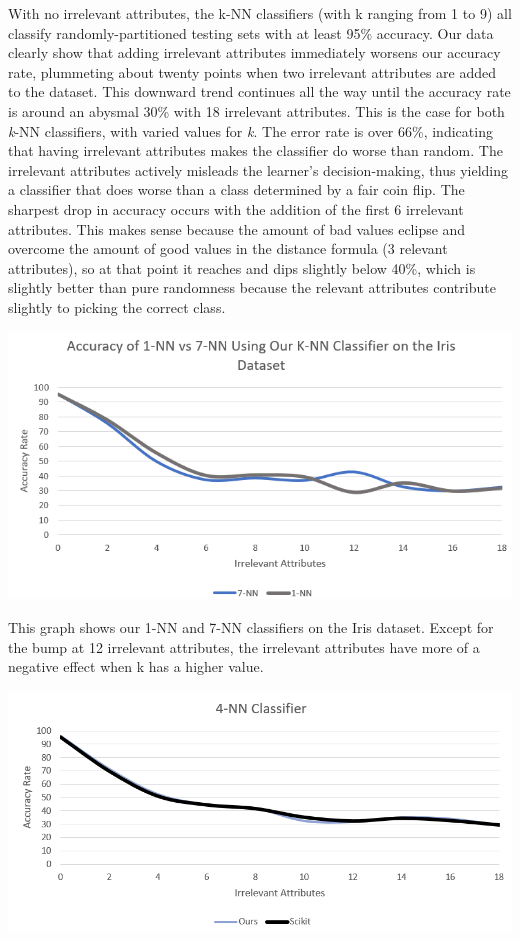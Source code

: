 \documentclass{article}
\begin{document}
With no irrelevant attributes, the k-NN classifiers (with k ranging from 1 to 9) all classify randomly-partitioned testing sets with at least 95\% accuracy. Our data clearly show that adding irrelevant attributes immediately worsens our accuracy rate, plummeting about twenty points when two irrelevant attributes are added to the dataset. This downward trend continues all the way until the accuracy rate is around an abysmal 30\% with 18 irrelevant attributes. This is the case for both\textit{ k}-NN classifiers, with varied values for \textit{k}. The error rate is over 66\%, indicating that having irrelevant attributes makes the classifier do worse than random. The irrelevant attributes actively misleads the learner's decision-making, thus yielding a classifier that does worse than a class determined by a fair coin flip. The sharpest drop in accuracy occurs with the addition of the first 6 irrelevant attributes. This makes sense because the amount of bad values eclipse and overcome the amount of good values in the distance formula (3 relevant attributes), so at that point it reaches and dips slightly below 40\%, which is slightly better than pure randomness because the relevant attributes contribute slightly to picking the correct class.

\begin{center}
\includegraphics[scale=0.7]{image2} \\
\end{center}

This graph shows our 1-NN and 7-NN classifiers on the Iris dataset. Except for the bump at 12 irrelevant attributes, the irrelevant attributes have more of a negative effect when k has a higher value.

\begin{center}
\includegraphics[scale=0.7]{image1} \\
\end{center}
\end{document}
